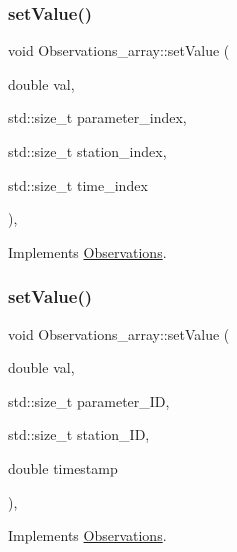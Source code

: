 \subsubsection{\texorpdfstring{set\+Value()}{setValue()}\hspace{0.1cm}{\footnotesize\ttfamily [1/2]}}
{\footnotesize\ttfamily void Observations\+\_\+array\+::set\+Value (\begin{DoxyParamCaption}\item[{double}]{val,  }\item[{std\+::size\+\_\+t}]{parameter\+\_\+index,  }\item[{std\+::size\+\_\+t}]{station\+\_\+index,  }\item[{std\+::size\+\_\+t}]{time\+\_\+index }\end{DoxyParamCaption})\hspace{0.3cm}{\ttfamily [override]}, {\ttfamily [virtual]}}



Implements \mbox{\hyperlink{class_observations_a6f00b4a2277ce9e77cd0d5975f4066f8}{Observations}}.

\mbox{\label{class_observations__array_a3994f0e11a8207c5e1182a9b20a67ec4}} 
\subsubsection{\texorpdfstring{set\+Value()}{setValue()}\hspace{0.1cm}{\footnotesize\ttfamily [2/2]}}
{\footnotesize\ttfamily void Observations\+\_\+array\+::set\+Value (\begin{DoxyParamCaption}\item[{double}]{val,  }\item[{std\+::size\+\_\+t}]{parameter\+\_\+\+ID,  }\item[{std\+::size\+\_\+t}]{station\+\_\+\+ID,  }\item[{double}]{timestamp }\end{DoxyParamCaption})\hspace{0.3cm}{\ttfamily [override]}, {\ttfamily [virtual]}}



Implements \mbox{\hyperlink{class_observations_a6ec8166ad0f141e23a07847ab3646a61}{Observations}}.

\mbox{\label{class_observations__array_ae4ed49512506eae597a158d4c87dbd31}} 
